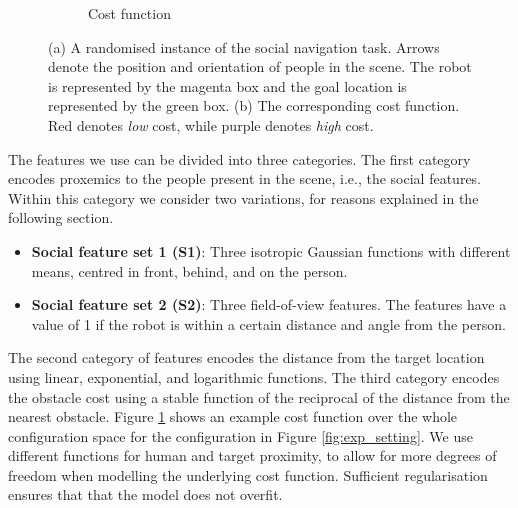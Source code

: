 \documentclass[a4paper,11pt]{report}
\begin{document}
\begin{figure}[tbh]
\begin{subfigure}[b]{0.35\columnwidth}
    \caption{Cost function}
    \label{fig:cost_f}
  \end{subfigure} 

  \caption[Simulated navigation task]{(a) A randomised instance of the social navigation task. Arrows denote the position and orientation of people in the scene. The robot is represented by the magenta box and the goal location is represented by the green box. (b) The corresponding cost function. Red denotes \emph{low} cost, while purple denotes \emph{high} cost.}

    \vspace{-2mm}

  \label{fig:setting}
  \end{figure}

	The features we use can be divided into three categories. The first category encodes proxemics to the people present in the scene, i.e., the social features. Within this category we consider two variations, for reasons explained in the following section.
	\begin{itemize}
		\item {\bf Social feature set 1 (S1)}: Three isotropic Gaussian functions with different means, centred in front, behind, and on the person.
		\item {\bf Social feature set 2 (S2)}: Three field-of-view features. The features have a value of 1 if the robot is within a certain distance and angle from the person.
	\end{itemize}
	  The second category of features encodes the distance from the target location using linear, exponential, and logarithmic functions. The third category encodes the obstacle cost using a stable function of the reciprocal of the distance from the nearest obstacle. Figure \ref{fig:cost_f} shows an example cost function over the whole configuration space for the configuration in Figure \ref{fig:exp_setting}. We use different functions for human and target proximity, to allow for more degrees of freedom when modelling the underlying cost function. Sufficient regularisation ensures that that the model does not overfit.
\end{document}
